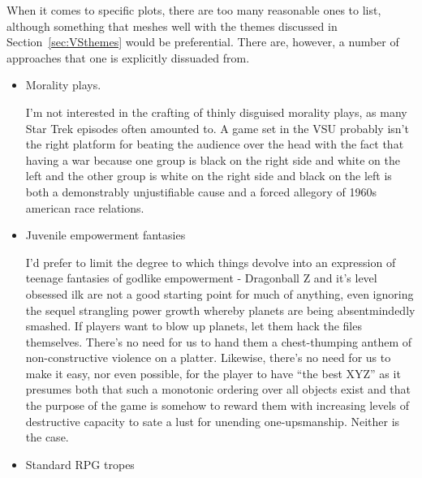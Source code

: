 When it comes to specific plots, there are too many reasonable ones to
list, although something that meshes well with the themes discussed in
Section~\ref{sec:VSthemes} would be preferential. There are, however,
a number of approaches that one is explicitly dissuaded from. 
\begin{itemize}

\item Morality plays. 

I'm not interested in the crafting of thinly disguised morality plays,
as many Star Trek episodes often amounted to. A game set in the VSU
probably isn't the right platform for beating the audience over the
head with the fact that having a war because one group is black on the
right side and white on the left and the other group is white on the
right side and black on the left is both a demonstrably unjustifiable
cause and a forced allegory of 1960s american race relations.

\item Juvenile empowerment fantasies

I'd prefer to limit the degree to which things devolve into an
expression of teenage fantasies of godlike empowerment - Dragonball Z
and it's level obsessed ilk are not a good starting point for much of
anything, even ignoring the sequel strangling power growth whereby
planets are being absentmindedly smashed. If players want to blow up
planets, let them hack the files themselves. There's no need for us to
hand them a chest-thumping anthem of non-constructive violence on a
platter. Likewise, there's no need for us to make it easy, nor even
possible, for the player to have ``the best XYZ'' as it presumes both
that such a monotonic ordering over all objects exist and that the
purpose of the game is somehow to reward them with increasing levels
of destructive capacity to sate a lust for unending
one-upsmanship. Neither is the case.

\item Standard RPG tropes


\end{itemize}
